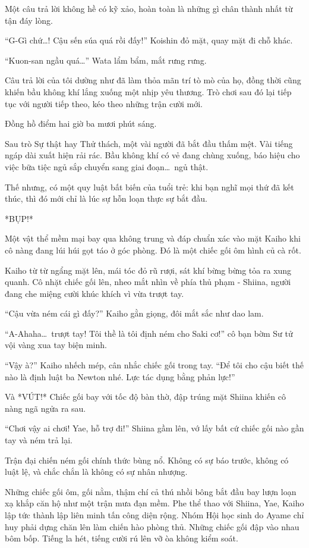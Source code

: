 \documentclass[../main.tex]{subfiles}
\begin{document}
Một câu trả lời không hề có kỹ xảo, hoàn toàn là những gì chân thành nhất từ tận đáy lòng.

``G-Gì chứ\dots! Cậu sến súa quá rồi đấy!'' Koishin đỏ mặt, quay mặt đi chỗ khác.

``Kuon-san ngầu quá\dots'' Wata lẩm bẩm, mắt rưng rưng.

Câu trả lời của tôi dường như đã làm thỏa mãn trí tò mò của họ, đồng thời cũng khiến bầu không khí lắng xuống một nhịp yêu thương. Trò chơi sau đó lại tiếp tục với người tiếp theo, kéo theo những trận cười mới.

\ct

Đồng hồ điểm hai giờ ba mươi phút sáng.

Sau trò Sự thật hay Thử thách, một vài người đã bắt đầu thấm mệt. Vài tiếng ngáp dài xuất hiện rải rác. Bầu không khí có vẻ đang chùng xuống, báo hiệu cho việc bữa tiệc ngủ sắp chuyển sang giai đoạn\dots\ ngủ thật.

Thế nhưng, có một quy luật bất biến của tuổi trẻ: khi bạn nghĩ mọi thứ đã kết thúc, thì đó mới chỉ là lúc sự hỗn loạn thực sự bắt đầu.

*BỤP!*

Một vật thể mềm mại bay qua không trung và đáp chuẩn xác vào mặt Kaiho khi cô nàng đang lúi húi gọt táo ở góc phòng. Đó là một chiếc gối ôm hình củ cà rốt.

Kaiho từ từ ngẩng mặt lên, mái tóc đỏ rũ rượi, sát khí bừng bừng tỏa ra xung quanh. Cô nhặt chiếc gối lên, nheo mắt nhìn về phía thủ phạm - Shiina, người đang che miệng cười khúc khích vì vừa trượt tay.

``Cậu vừa ném cái gì đấy?'' Kaiho gằn giọng, đôi mắt sắc như dao lam.

``A-Ahaha\dots\ trượt tay! Tôi thề là tôi định ném cho Saki cơ!'' cô bạn bờm Sư tử vội vàng xua tay biện minh.

``Vậy à?'' Kaiho nhếch mép, cân nhắc chiếc gối trong tay. ``Để tôi cho cậu biết thế nào là định luật ba Newton nhé. Lực tác dụng bằng phản lực!''

Và *VÚT!* Chiếc gối bay với tốc độ bàn thờ, đập trúng mặt Shiina khiến cô nàng ngã ngửa ra sau.

``Chơi vậy ai chơi! Yae, hỗ trợ đi!'' Shiina gầm lên, vớ lấy bất cứ chiếc gối nào gần tay và ném trả lại.

Trận đại chiến ném gối chính thức bùng nổ. Không có sự báo trước, không có luật lệ, và chắc chắn là không có sự nhân nhượng.

Những chiếc gối ôm, gối nằm, thậm chí cả thú nhồi bông bắt đầu bay lượn loạn xạ khắp căn hộ như một trận mưa đạn mềm. Phe thể thao với Shiina, Yae, Kaiho lập tức thành lập liên minh tấn công diện rộng. Nhóm Hội học sinh do Ayame chỉ huy phải dựng chăn lên làm chiến hào phòng thủ. Những chiếc gối đập vào nhau bôm bốp. Tiếng la hét, tiếng cười rú lên vỡ òa không kiểm soát.
\end{document}
